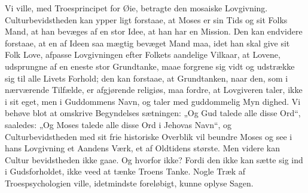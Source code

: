 \documentclass[12pt]{book}
\newcommand{\opage}[1]{\marginnote{\footnotesize\textit{[#1]}}}
\begin{document}
Vi ville, med Troesprincipet for Øie, betragte den
mosaiske Lovgivning. Culturbevidstheden kan ypper\-%
ligt forstaae, at Moses er sin Tids og sit Folks Mand,
at han bevæges af en stor Idee, at han har en Mission.
Den kan endvidere forstaae, at en af Ideen saa mægtig
bevæget Mand maa, idet han skal give sit Folk Love,
afpasse Lovgivningen efter Folkets aandelige Vilkaar, at
Lovene, udsprungne af en eneste stor Grundtanke, maae
forgrene sig vidt og udstrække sig til alle Livets
Forhold; den kan forstaae, at Grundtanken, naar den,
som i nærværende Tilfælde, er afgjørende religiøs,
maa fordre, at Lovgiveren taler, ikke i sit eget, men i
Guddommens Navn, og taler med guddommelig Myn\-%
dighed. Vi behøve blot at omskrive Begyndelses\-%
sætningen: „Og Gud talede alle disse Ord“, saaledes:
„Og Moses talede alle disse Ord i Jehovas Navn“, og
\opage{185}\setcounter{footnote}{0}%
Culturbevidstheden med sit frie historiske Overblik vil
beundre Moses og see i hans Lovgivning et Aandens
Værk, et af Oldtidens største. Men videre kan Cultur\-%
bevidstheden ikke gaae. Og hvorfor ikke? Fordi den
ikke kan sætte sig ind i Gudsforholdet, ikke veed at tænke
Troens Tanke. Nogle Træk af Troespsychologien ville,
idetmindste foreløbigt, kunne oplyse Sagen.
\end{document}
